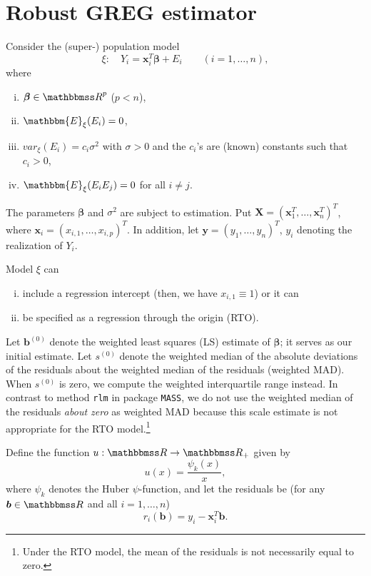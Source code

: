 \documentclass[a4paper,11pt]{scrreprt}
\theoremstyle{remark}
\begin{document}
\chapter{Robust GREG estimator}\label{ch:greg}
Consider the (super-) population model
\begin{equation*}
   \xi: \quad Y_i = \bm x_i^T\bm \beta + E_i \qquad(i=1,\ldots, n),
\end{equation*}
\noindent where 
\begin{enumerate}[i)]
   \item $\bm \beta \in \R^p$ ($p < n$),
   \item $\mathbbm{E}_{\xi}(E_i)=0$,  
   \item $var_{\xi}(E_i) = c_i \sigma^2$ with $\sigma > 0$ and the $c_i$'s are (known) constants such that $c_i > 0$,
   \item $\mathbbm{E}_{\xi}(E_iE_j)=0$ for all $i \neq j$. 
\end{enumerate}

\noindent The parameters $\bm \beta$ and $\sigma^2$ are subject to estimation. Put $\bm X = (\bm x_1^T, \ldots, \bm x_n^T)^T$, where $\bm x_i = (x_{i,1}, \ldots, x_{i,p})^T$. In addition, let $\bm y = (y_1, \ldots, y_n)^T$, $y_i$ denoting the realization of $Y_i$. 

Model $\xi$ can 
\begin{enumerate}[i)]
   \item include a regression intercept (then, we have $x_{i,1} \equiv 1$)  or it can 
   \item be specified as a regression through the origin (RTO).  
\end{enumerate}

Let $\bm b^{(0)}$ denote the weighted least squares (LS) estimate of $\bm \beta$; it serves as our initial estimate. Let  $s^{(0)}$ denote the weighted median of the absolute deviations of the residuals about the weighted median of the residuals (weighted MAD). When $s^{(0)}$ is zero, we compute the weighted interquartile range instead. In contrast to method \texttt{rlm} in package \texttt{MASS}, we do not use the weighted median of the residuals \textit{about zero} as weighted MAD because this scale estimate is not appropriate for the RTO model.\footnote{Under the RTO model, the mean of the residuals is not necessarily equal to zero.} 

Define the function $u:\R \rightarrow \R_+$ given by 
\begin{equation*}
   u(x) = \frac{\psi_k(x)}{x},
\end{equation*}
\noindent where $\psi_k$ denotes the Huber $\psi$-function, and let the residuals be (for any $\bm b \in \R$ and all $i=1,\ldots,n$) 
\begin{equation*}
   r_i(\bm b) = y_i - \bm x_i^T \bm b.
\end{equation*}
\end{document}
